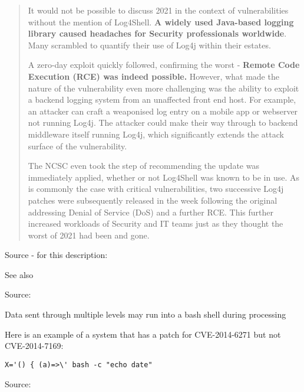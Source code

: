\documentclass[Screen16to9,17pt]{foils}
\begin{document}
\begin{quote}\small
It would not be possible to discuss 2021 in the context of vulnerabilities without the mention of Log4Shell. {\bf A widely used Java-based logging library caused headaches for Security professionals worldwide}. Many scrambled to quantify their use of Log4j within their estates.

A zero-day exploit quickly followed, confirming the worst - {\bf Remote Code Execution (RCE) was indeed possible.} However, what made the nature of the vulnerability even more challenging was the ability to exploit a backend logging system from an unaffected front end host. For example, an attacker can craft a weaponised log entry on a mobile app or webserver not running Log4j. The attacker could make their way through to backend middleware itself running Log4j, which significantly extends the attack surface of the vulnerability.

The NCSC even took the step of recommending the update was immediately applied, whether or not Log4Shell was known to be in use. As is commonly the case with critical vulnerabilities, two successive Log4j patches were subsequently released in the week following the original addressing Denial of Service (DoS) and a further RCE. This further increased workloads of Security and IT teams just as they thought the worst of 2021 had been and gone.
\end{quote}
Source - for this description:\\

See also 




Source:

\centerline{Data sent through multiple levels may run into a bash shell during processing}


Here is an example of a system that has a patch for CVE-2014-6271 but not CVE-2014-7169:



\verb+X='() { (a)=>\' bash -c "echo date"+

Source: 
\end{document}
